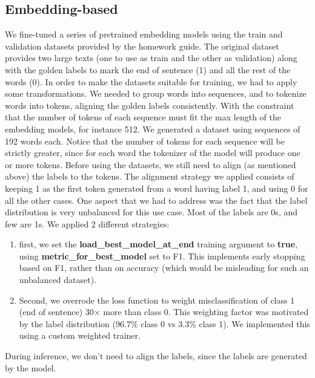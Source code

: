 \documentclass[11pt]{article}
\begin{document}
\subsection{Embedding-based}
We fine-tuned a series of pretrained embedding models using the train and validation datasets provided by the homework guide. \newline The original dataset provides two large texts (one to use as train and the other as validation) along with the golden labels to mark the end of sentence (1) and all the rest of the words (0). \newline In order to make the datasets suitable for training, we had to apply some transformations. \newline We needed to group words into sequences, and to tokenize words into tokens, aligning the golden labels consistently. \newline With the constraint that the number of tokens of each sequence must fit the max length of the embedding models, for instance 512. \newline We generated a dataset using sequences of 192 words each. Notice that the number of tokens for each sequence will be strictly greater, since for each word the tokenizer of the model will produce one or more tokens. \newline Before using the datasets, we still need to align (as mentioned above) the labels to the tokens. \newline The alignment strategy we applied consists of keeping 1 as the first token generated from a word having label 1, and using 0 for all the other cases. \newline One aspect that we had to address was the fact that the label distribution is very unbalanced for this use case. Most of the labels are 0s, and few are 1s. We applied 2 different strategies:
\begin{enumerate}
    \item first, we set the \textbf{load\_best\_model\_at\_end} training argument to \textbf{true}, using \textbf{metric\_for\_best\_model} set to F1. This implements early stopping based on F1, rather than on accuracy (which would be misleading for such an unbalanced dataset).
    \item Second, we overrode the loss function to weight misclassification of class 1 (end of sentence) 30× more than class 0. This weighting factor was motivated by the label distribution (96.7\% class 0 vs 3.3\% class 1). We implemented this using a custom weighted trainer. 
\end{enumerate}
During inference, we don't need to align the labels, since the labels are generated by the model.
\end{document}
